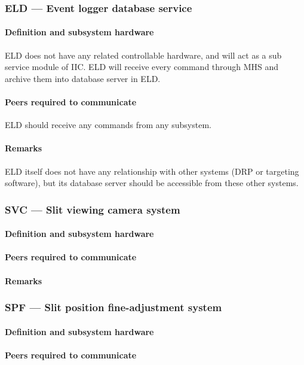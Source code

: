 \documentclass[a4paper,notitlepage]{article}
\begin{document}
\subsubsection{ELD --- Event logger database service}
\paragraph{Definition and subsystem hardware}
ELD does not have any related controllable hardware, and will act as a sub 
service module of IIC. 
ELD will receive every command through MHS and archive them into database 
server in ELD. 
\paragraph{Peers required to communicate}
ELD should receive any commands from any subsystem. 
\paragraph{Remarks}
ELD itself does not have any relationship with other systems (DRP or targeting 
software), but its database server should be accessible from these other 
systems.

\subsubsection{SVC --- Slit viewing camera system}
\paragraph{Definition and subsystem hardware}
\tbd
\paragraph{Peers required to communicate}
\tbd
\paragraph{Remarks}
\tbd

\subsubsection{SPF --- Slit position fine-adjustment system}
\paragraph{Definition and subsystem hardware}
\tbd
\paragraph{Peers required to communicate}
\tbd
\end{document}
